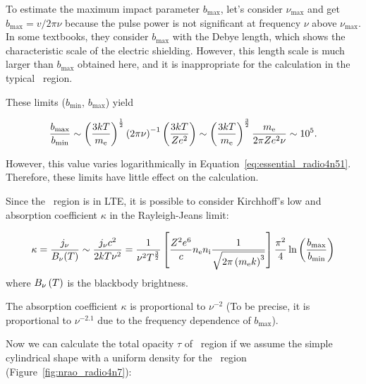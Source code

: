 To estimate the maximum impact parameter $b_{\max}$, let's consider $\nu_{\max}$ and get $b_{\max} = v/2\pi \nu$ because the pulse power is not significant at frequency $\nu$ above $\nu_{\max}$.
In some textbooks, they consider $b_{\max}$ with the Debye length, which shows the characteristic scale of the electric shielding.
However, this length scale is much larger than $b_{\max}$ obtained here, and it is inappropriate for the calculation in the typical \ih~region.

These limits ($b_{\min}$, $b_{\max}$) yield

\begin{equation}\label{eq:essential_radio4n49}
    \frac{b_{\max }}{b_{\min }} \sim \left(\frac{3 k T}{m_{\mathrm{e}}}\right)^{\frac{1}{2}}\left(2 \pi \nu\right)^{-1}\left(\frac{3 k T}{Z e^{2}}\right) \sim \left(\frac{3 k T}{m_{\mathrm{e}}}\right)^{\frac{3}{2}} \frac{m_{\mathrm{e}}}{2 \pi Z e^{2} \nu} \sim 10^5.
\end{equation}

However, this value varies logarithmically in Equation~\ref{eq:essential_radio4n51}.
Therefore, these limits have little effect on the calculation.

Since the \ih~region is in LTE, it is possible to consider Kirchhoff's low and absorption coefficient $\kappa$ in the Rayleigh-Jeans limit:

\begin{equation}\label{eq:essential_radio4n51}
    \kappa=\frac{j_{\nu}}{B_{\nu}(T)} \sim \frac{j_{\nu} c^2}{2 k T \nu^2} = \frac{1}{\nu^2 T^{\frac{3}{2}}}\left[\frac{Z^2 e^6}{c} n_{\mathrm{e}} n_{\mathrm{i}} \frac{1}{\sqrt{2\pi\left(m_{\mathrm{e}} k\right)^3}}\right] \frac{\pi^2}{4} \ln \left(\frac{b_{\max}}{b_{\min}}\right)
\end{equation}
where $B_{\nu}\left(T\right)$ is the blackbody brightness.

The absorption coefficient $\kappa$ is proportional to $\nu^{-2}$ (To be precise, it is proportional to $\nu^{-2.1}$ due to the frequency dependence of $b_{\max}$).

Now we can calculate the total opacity $\tau$ of \ih~region if we assume the simple cylindrical shape with a uniform density for the \ih~region (Figure~\ref{fig:nrao_radio4n7}):

